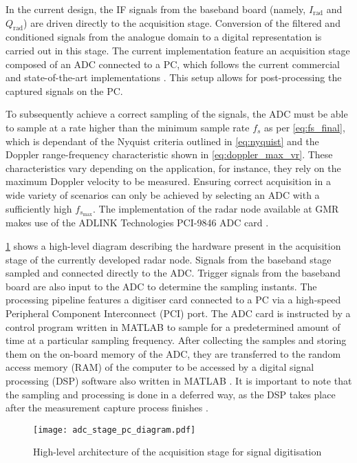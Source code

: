 In the current design, the IF signals from the baseband board (namely, $I_\mathrm{rad}$ and $Q_\mathrm{rad}$) are driven directly to the acquisition stage. Conversion of the filtered and conditioned signals from the analogue domain to a digital representation is carried out in this stage. The current implementation feature an acquisition stage composed of an ADC connected to a PC, which follows the current commercial and state-of-the-art implementations \cite{Antolinos2020,Biase2020,Zanardi2021,Seifert2019, Iyer2022, Amin2017}. This setup allows for post-processing the captured signals on the PC.

To subsequently achieve a correct sampling of the signals, the ADC must be able to sample at a rate higher than the minimum sample rate $f_s$ as per \cref{eq:fs_final}, which is dependant of the Nyquist criteria outlined in \cref{eq:nyquist} and the Doppler range-frequency characteristic shown in \cref{eq:doppler_max_vr}. These characteristics vary depending on the application, for instance, they rely on the maximum Doppler velocity to be measured. Ensuring correct acquisition in a wide variety of scenarios can only be achieved by selecting an ADC with a sufficiently high $f_{s_{\max}}$. The implementation of the radar node available at GMR makes use of the ADLINK Technologies PCI-9846 ADC card \cite{ADLINKTechnologies2010, Sardinero2022}.

\cref{fig:adc_general} shows a high-level diagram describing the hardware present in the acquisition stage of the currently developed radar node. Signals from the baseband stage sampled and connected directly to the ADC. Trigger signals from the baseband board are also input to the ADC to determine the sampling instants. The processing pipeline features a digitiser card connected to a PC via a high-speed Peripheral Component Interconnect (PCI) port. The ADC card is instructed by a control program written in MATLAB \cite{Antolinos2020, Sardinero2022} to sample for a predetermined amount of time at a particular sampling frequency. After collecting the samples and storing them on the on-board memory of the ADC, they are transferred to the random access memory (RAM) of the computer to be accessed by a digital signal processing (DSP) software also written in MATLAB \cite{Antolinos2020, Sardinero2022}. It is important to note that the sampling and processing is done in a deferred way, as the DSP takes place after the measurement capture process finishes \cite[p.~43-44]{ADLINKTechnologies2010}.

\begin{figure}[ht]
	\centering
	\texttt{[image: adc\_stage\_pc\_diagram.pdf]}
	\caption{High-level architecture of the acquisition stage for signal digitisation \label{fig:adc_general}}
\end{figure}


